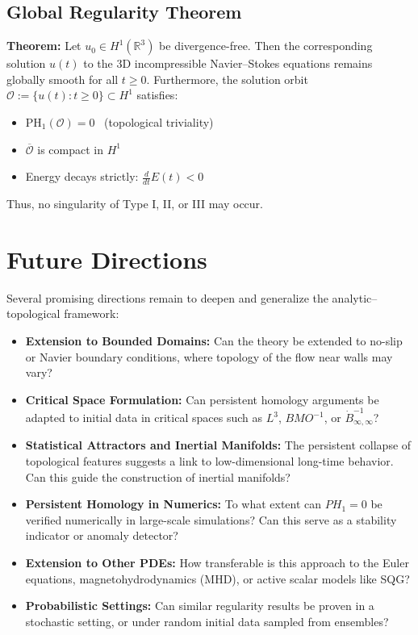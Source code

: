 \documentclass[11pt]{article}
\theoremstyle{definition}
\begin{document}
\subsection*{Global Regularity Theorem}
\textbf{Theorem:} Let $u_0 \in H^1(\mathbb{R}^3)$ be divergence-free. Then the corresponding solution $u(t)$ to the 3D incompressible Navier--Stokes equations remains globally smooth for all $t \ge 0$. Furthermore, the solution orbit $\mathcal{O} := \{ u(t) : t \ge 0 \} \subset H^1$ satisfies:
\begin{itemize}
  \item $\mathrm{PH}_1(\mathcal{O}) = 0$ \ (topological triviality)
  \item $\overline{\mathcal{O}}$ is compact in $H^1$
  \item Energy decays strictly: $\frac{d}{dt} E(t) < 0$
\end{itemize}
\noindent Thus, no singularity of Type I, II, or III may occur.

\section{Future Directions}
\label{sec:future}
Several promising directions remain to deepen and generalize the analytic–topological framework:

\begin{itemize}
  \item \textbf{Extension to Bounded Domains:} Can the theory be extended to no-slip or Navier boundary conditions, where topology of the flow near walls may vary?
  \item \textbf{Critical Space Formulation:} Can persistent homology arguments be adapted to initial data in critical spaces such as $L^3$, $BMO^{-1}$, or $\dot{B}^{-1}_{\infty,\infty}$?
  \item \textbf{Statistical Attractors and Inertial Manifolds:} The persistent collapse of topological features suggests a link to low-dimensional long-time behavior. Can this guide the construction of inertial manifolds?
  \item \textbf{Persistent Homology in Numerics:} To what extent can $PH_1 = 0$ be verified numerically in large-scale simulations? Can this serve as a stability indicator or anomaly detector?
  \item \textbf{Extension to Other PDEs:} How transferable is this approach to the Euler equations, magnetohydrodynamics (MHD), or active scalar models like SQG?
  \item \textbf{Probabilistic Settings:} Can similar regularity results be proven in a stochastic setting, or under random initial data sampled from ensembles?
\end{itemize}
\end{document}
